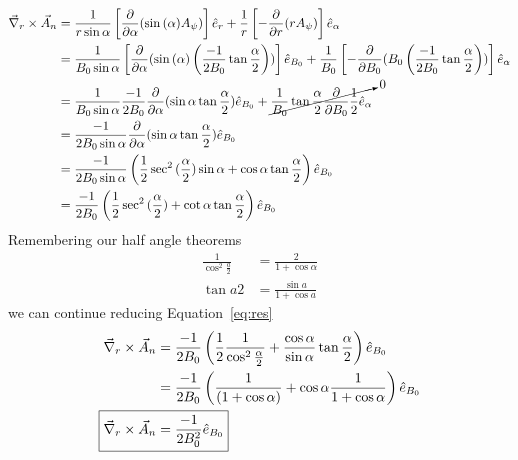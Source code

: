 \documentclass{jhwhw}
\begin{document}
\begin{align}
    \vec{\nabla}_r \times \vec{A}_n
    &=
    \frac{1}{r \sin{\alpha}}
    \left[
    \frac{\partial}{\partial \alpha} (\sin{(\alpha)}A_\psi)
    \right]\hat{e}_r
    +
    \frac{1}{r}
    \left[
    -\frac{\partial}{\partial r}(r A_\psi)
    \right]\hat{e}_\alpha
    \\
    &=
    \frac{1}{B_0 \sin{\alpha}}
    \left[
    \frac{\partial}{\partial \alpha} (\sin{(\alpha)}\left(\frac{-1}{2 B_0} \tan{\frac{\alpha}{2}}\right))
    \right]\hat{e}_{B_0}
    +
    \frac{1}{B_0}
    \left[
    -\frac{\partial}{\partial B_0}(B_0 \left(\frac{-1}{2 B_0} \tan{\frac{\alpha}{2}}\right))
    \right]\hat{e}_\alpha
    \\
    &=
    \frac{1}{B_0 \sin{\alpha}}
    \frac{-1}{2 B_0}
    \frac{\partial}{\partial\alpha}
    (
    \sin{\alpha}\tan{\frac{\alpha}{2}}
    )\hat{e}_{B_0}
    +
    \cancelto{0}
    {
    \frac{1}{B_0}
    \tan{\frac{\alpha}{2}}
    \frac{\partial}{\partial B_0}\frac{1}{2}\hat{e}_\alpha}
    \\
    &=
    \frac{-1}{2 B_0 \sin{\alpha}} \frac{\partial}{\partial \alpha}
    (
    \sin{\alpha}\tan{\frac{\alpha}{2}}
    )
    \hat{e}_{B_0}
    \\
    &=
    \frac{-1}{2 B_0 \sin{\alpha}}
    \left(
    \frac{1}{2}\sec^2{(\frac{\alpha}{2})}\sin{\alpha}+\cos{\alpha}\tan{\frac{\alpha}{2}}
    \right)
    \hat{e}_{B_0}
    \\
    \label{eq:res}
    &=
    \frac{-1}{2 B_0}
    \left(
    \frac{1}{2}\sec^2{(\frac{\alpha}{2})}+\cot{\alpha}\tan{\frac{\alpha}{2}}
    \right)
    \hat{e}_{B_0}
\end{align}
Remembering our half angle theorems
\begin{align}
    \frac{1}{\cos^2{\frac{a}{2}}} &= \frac{2}{1 + \cos{\alpha}}
    \\
    \tan{a}{2}&= \frac{\sin{a}}{1+\cos{a}}
\end{align}
we can continue reducing Equation~\eqref{eq:res}
\begin{align}
    \vec{\nabla}_r \times \vec{A}_n
    &=
    \frac{-1}{2 B_0}
    \left(
    \frac{1}{2}
    \frac{1}{\cos^2{\frac{\alpha}{2}}}
    +
    \frac{\cos{\alpha}}{\sin{\alpha}}
    \tan{\frac{\alpha}{2}}
    \right)\hat{e}_{B_0}
    \\
    &=
    \frac{-1}{2 B_0}
    \left(
    \frac{1}{(1 + \cos{\alpha})}
    +
    \cos{\alpha}
    \frac{1}{1 + \cos{\alpha}}
    \right)\hat{e}_{B_0}
    \\
    \Aboxed{
    \vec{\nabla}_r \times \vec{A}_n
    &=
    \frac{-1}{2 B_0^2}
    \hat{e}_{B_0}}
\end{align}
\end{document}
